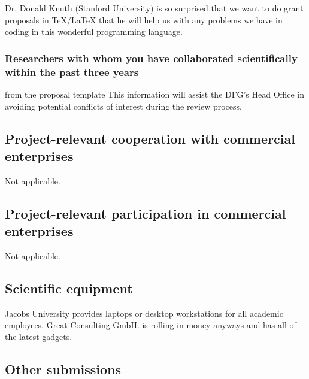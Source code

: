 \begin{compactdesc}
\item[Dr. Donald Knuth (Stanford University)] is so surprised that we want to do grant
  proposals in {\TeX/\LaTeX} that he will help us with any problems we have in coding in
  this wonderful programming language.
\end{compactdesc}

\subsubsection{Researchers with whom you have collaborated scientifically within the past three years }


\begin{todo}{from the proposal template}
This information will assist the DFG’s Head Office in avoiding potential conflicts of interest during the review process.
\end{todo}

\subsection{Project-relevant cooperation with commercial enterprises}
Not applicable.

\subsection{Project-relevant participation in commercial enterprises}
Not applicable.

\subsection{Scientific equipment }

Jacobs University provides laptops or desktop workstations for all academic
employees. Great Consulting GmbH. is rolling in money anyways and has all of the latest
gadgets.

\subsection{Other submissions}

